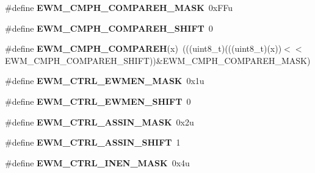 \begin{DoxyCompactItemize}
\item 
\#define {\bfseries E\+W\+M\+\_\+\+C\+M\+P\+H\+\_\+\+C\+O\+M\+P\+A\+R\+E\+H\+\_\+\+M\+A\+SK}~0x\+F\+Fu\hypertarget{group__EWM__Register__Masks_ga2bba159a8c0eaace911da192c1747c73}{}\label{group__EWM__Register__Masks_ga2bba159a8c0eaace911da192c1747c73}

\item 
\#define {\bfseries E\+W\+M\+\_\+\+C\+M\+P\+H\+\_\+\+C\+O\+M\+P\+A\+R\+E\+H\+\_\+\+S\+H\+I\+FT}~0\hypertarget{group__EWM__Register__Masks_ga02d5e37ee2e38be4d3654c4eb0854cb5}{}\label{group__EWM__Register__Masks_ga02d5e37ee2e38be4d3654c4eb0854cb5}

\item 
\#define {\bfseries E\+W\+M\+\_\+\+C\+M\+P\+H\+\_\+\+C\+O\+M\+P\+A\+R\+EH}(x)~(((uint8\+\_\+t)(((uint8\+\_\+t)(x))$<$$<$E\+W\+M\+\_\+\+C\+M\+P\+H\+\_\+\+C\+O\+M\+P\+A\+R\+E\+H\+\_\+\+S\+H\+I\+FT))\&E\+W\+M\+\_\+\+C\+M\+P\+H\+\_\+\+C\+O\+M\+P\+A\+R\+E\+H\+\_\+\+M\+A\+SK)\hypertarget{group__EWM__Register__Masks_gae012c25873f36888e3d0302060c97be5}{}\label{group__EWM__Register__Masks_gae012c25873f36888e3d0302060c97be5}

\item 
\#define {\bfseries E\+W\+M\+\_\+\+C\+T\+R\+L\+\_\+\+E\+W\+M\+E\+N\+\_\+\+M\+A\+SK}~0x1u\hypertarget{group__EWM__Register__Masks_ga7426f0a484ad28b92efb90ef0e3f01fd}{}\label{group__EWM__Register__Masks_ga7426f0a484ad28b92efb90ef0e3f01fd}

\item 
\#define {\bfseries E\+W\+M\+\_\+\+C\+T\+R\+L\+\_\+\+E\+W\+M\+E\+N\+\_\+\+S\+H\+I\+FT}~0\hypertarget{group__EWM__Register__Masks_gafac96f184ce423d5872e0ca6e258d004}{}\label{group__EWM__Register__Masks_gafac96f184ce423d5872e0ca6e258d004}

\item 
\#define {\bfseries E\+W\+M\+\_\+\+C\+T\+R\+L\+\_\+\+A\+S\+S\+I\+N\+\_\+\+M\+A\+SK}~0x2u\hypertarget{group__EWM__Register__Masks_ga24fe6289cbd9e813f99fb721d28b7bb5}{}\label{group__EWM__Register__Masks_ga24fe6289cbd9e813f99fb721d28b7bb5}

\item 
\#define {\bfseries E\+W\+M\+\_\+\+C\+T\+R\+L\+\_\+\+A\+S\+S\+I\+N\+\_\+\+S\+H\+I\+FT}~1\hypertarget{group__EWM__Register__Masks_gac397960fb320e62f5c89e057e9f5ce13}{}\label{group__EWM__Register__Masks_gac397960fb320e62f5c89e057e9f5ce13}

\item 
\#define {\bfseries E\+W\+M\+\_\+\+C\+T\+R\+L\+\_\+\+I\+N\+E\+N\+\_\+\+M\+A\+SK}~0x4u\hypertarget{group__EWM__Register__Masks_ga4366a1e4b346e8a61898588faa0ca7df}{}\label{group__EWM__Register__Masks_ga4366a1e4b346e8a61898588faa0ca7df}


\end{DoxyCompactItemize}
